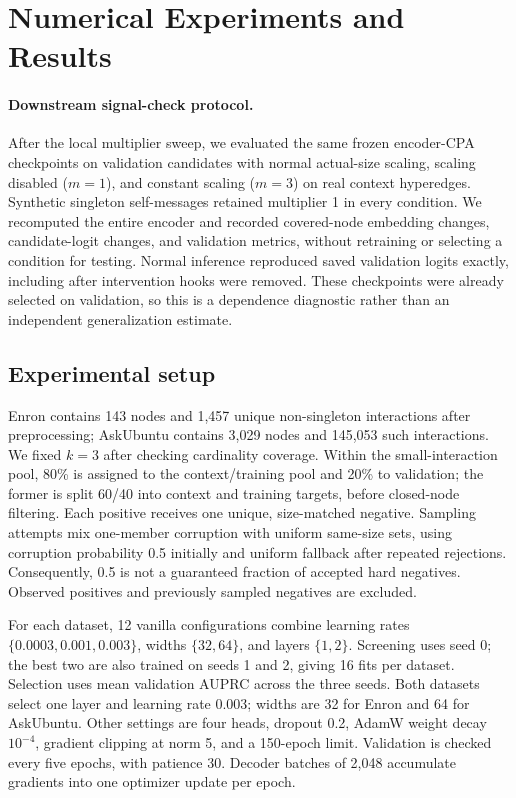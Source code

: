 \documentclass{article}
\begin{document}
\section{Numerical Experiments and Results}
\paragraph{Downstream signal-check protocol.}
After the local multiplier sweep, we evaluated the same frozen encoder-CPA checkpoints on validation candidates with normal actual-size scaling, scaling disabled ($m=1$), and constant scaling ($m=3$) on real context hyperedges. Synthetic singleton self-messages retained multiplier 1 in every condition. We recomputed the entire encoder and recorded covered-node embedding changes, candidate-logit changes, and validation metrics, without retraining or selecting a condition for testing. Normal inference reproduced saved validation logits exactly, including after intervention hooks were removed. These checkpoints were already selected on validation, so this is a dependence diagnostic rather than an independent generalization estimate.

\subsection{Experimental setup}
Enron contains 143 nodes and 1,457 unique non-singleton interactions after preprocessing; AskUbuntu contains 3,029 nodes and 145,053 such interactions. We fixed $k=3$ after checking cardinality coverage. Within the small-interaction pool, 80\% is assigned to the context/training pool and 20\% to validation; the former is split 60/40 into context and training targets, before closed-node filtering. Each positive receives one unique, size-matched negative. Sampling attempts mix one-member corruption with uniform same-size sets, using corruption probability 0.5 initially and uniform fallback after repeated rejections. Consequently, 0.5 is not a guaranteed fraction of accepted hard negatives. Observed positives and previously sampled negatives are excluded.

For each dataset, 12 vanilla configurations combine learning rates $\{0.0003,0.001,0.003\}$, widths $\{32,64\}$, and layers $\{1,2\}$. Screening uses seed 0; the best two are also trained on seeds 1 and 2, giving 16 fits per dataset. Selection uses mean validation AUPRC across the three seeds. Both datasets select one layer and learning rate 0.003; widths are 32 for Enron and 64 for AskUbuntu. Other settings are four heads, dropout 0.2, AdamW weight decay $10^{-4}$, gradient clipping at norm 5, and a 150-epoch limit. Validation is checked every five epochs, with patience 30. Decoder batches of 2,048 accumulate gradients into one optimizer update per epoch.
\end{document}
